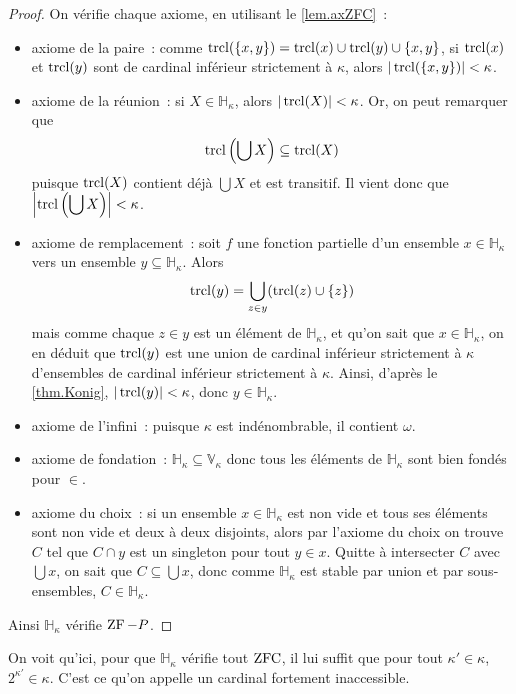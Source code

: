 \begin{proof}
  On vérifie chaque axiome, en utilisant le \cref{lem.axZFC}~:
  \begin{itemize}
  \item axiome de la paire~: comme
    $\operatorname{trcl}(\{x,y\}) = \operatorname{trcl}(x) \cup \operatorname{trcl}(y) \cup \{x,y\}$, si
    $\operatorname{trcl}(x)$ et $\operatorname{trcl}(y)$ sont de cardinal inférieur strictement à $\kappa$,
    alors $|\operatorname{trcl}(\{x,y\})| < \kappa$.
  \item axiome de la réunion~: si $X\in \mathbb H_\kappa$, alors
    $|\operatorname{trcl}(X)| < \kappa$. Or, on peut remarquer que
    \[\operatorname{trcl}\left(\bigcup X\right)\subseteq \operatorname{trcl}(X)\]
    puisque $\operatorname{trcl}(X)$ contient déjà $\bigcup X$ et est transitif. Il vient donc
    que $\displaystyle\left|\operatorname{trcl}\left(\bigcup X\right)\right| < \kappa$.
  \item axiome de remplacement~: soit $f$ une fonction partielle d'un
    ensemble $x \in \mathbb H_\kappa$ vers un ensemble
    $y \subseteq \mathbb H_\kappa$. Alors
    \[\operatorname{trcl}(y) = \bigcup_{z \in y} (\operatorname{trcl}(z)\cup \{z\})\]
    mais comme chaque $z \in y$ est un élément de $\mathbb H_\kappa$, et qu'on
    sait que $x \in \mathbb H_\kappa$, on en déduit que $\operatorname{trcl}(y)$ est une
    union de cardinal inférieur strictement à $\kappa$ d'ensembles de cardinal
    inférieur strictement à $\kappa$. Ainsi, d'après le \cref{thm.Konig},
    $|\operatorname{trcl}(y)| < \kappa$, donc $y \in \mathbb H_\kappa$.
  \item axiome de l'infini~: puisque $\kappa$ est indénombrable, il contient
    $\omega$.
  \item axiome de fondation~: $\mathbb H_\kappa \subseteq \mathbb V_\kappa$ donc
    tous les éléments de $\mathbb H_\kappa$ sont bien fondés pour $\in$.
  \item axiome du choix~: si un ensemble $x \in \mathbb H_\kappa$ est non vide
    et tous ses éléments sont non vide et deux à deux disjoints, alors par
    l'axiome du choix on trouve $C$ tel que $C \cap y$ est un singleton pour
    tout $y \in x$. Quitte à intersecter $C$ avec $\bigcup x$, on sait que
    $C\subseteq \bigcup x$, donc comme $\mathbb H_\kappa$ est stable par
    union et par sous-ensembles, $C \in \mathbb H_\kappa$.
  \end{itemize}
  Ainsi $\mathbb H_\kappa$ vérifie $\operatorname{ZF} - P$.
\end{proof}

On voit qu'ici, pour que $\mathbb H_\kappa$ vérifie tout $\operatorname{ZFC}$, il lui suffit
que pour tout $\kappa' \in \kappa$, $2^{\kappa'} \in \kappa$. C'est ce qu'on
appelle un cardinal fortement inaccessible.

